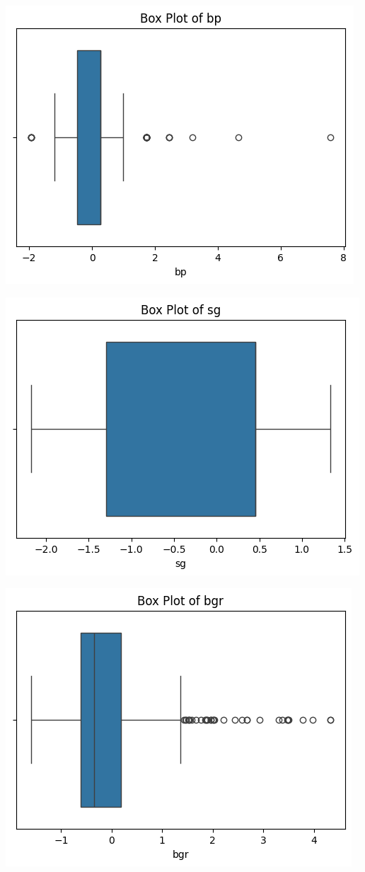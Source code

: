 \documentclass[
  11pt,
  letterpaper,
  DIV=11,
  numbers=noendperiod]{scrartcl}
\begin{document}
\includegraphics{Assignment6_Final version_files/figure-pdf/cell-18-output-2.png}

\includegraphics{Assignment6_Final version_files/figure-pdf/cell-18-output-3.png}

\includegraphics{Assignment6_Final version_files/figure-pdf/cell-18-output-4.png}
\end{document}
